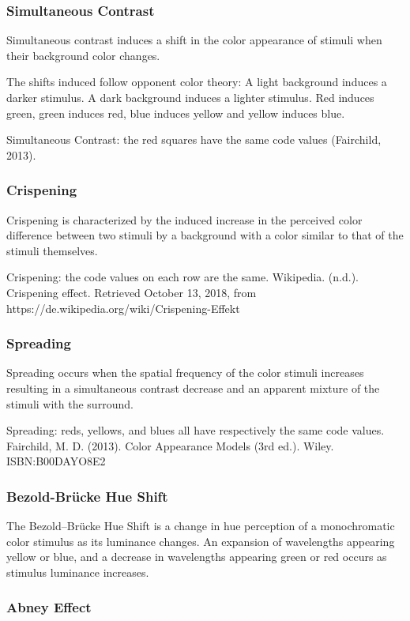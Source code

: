 \subsubsection{Simultaneous Contrast}
Simultaneous contrast induces a shift in the color appearance of stimuli when their background color changes.

The shifts induced follow opponent color theory:
A light background induces a darker stimulus.
A dark background induces a lighter stimulus.
Red induces green, green induces red, blue induces yellow and yellow induces blue.

Simultaneous Contrast: the red squares have the same code values (Fairchild, 2013).

\subsubsection{Crispening}

Crispening is characterized by the induced increase in the perceived color difference between two stimuli by a background with a color similar to that of the stimuli themselves.

Crispening: the code values on each row are the same.
Wikipedia. (n.d.). Crispening effect. Retrieved October 13, 2018, from https://de.wikipedia.org/wiki/Crispening-Effekt

\subsubsection{Spreading}

Spreading occurs when the spatial frequency of the color stimuli increases resulting in a simultaneous contrast decrease and an apparent mixture of the stimuli with the surround.

Spreading: reds, yellows, and blues all have respectively the same code values.
Fairchild, M. D. (2013). Color Appearance Models (3rd ed.). Wiley. ISBN:B00DAYO8E2

\subsubsection{Bezold-Brücke Hue Shift}

The Bezold–Brücke Hue Shift is a change in hue perception of a monochromatic color stimulus as its luminance changes. An expansion of wavelengths appearing yellow or blue, and a decrease in wavelengths appearing green or red occurs as stimulus luminance increases.

\subsubsection{Abney Effect}

